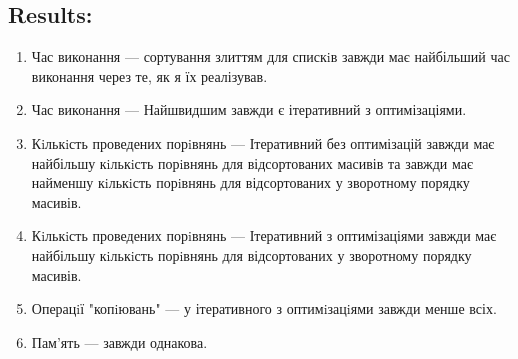 \documentclass{article}
\begin{document}
    \subsection{Results:}
    \begin{enumerate}
        \item Час виконання --- сортування злиттям для спискiв завжди має найбільший час виконання через те, як я їх реалізував.
        \item Час виконання --- Найшвидшим завжди є ітеративний з оптимізаціями.
        \item Кiлькiсть проведених порiвнянь --- Ітеративний без оптимізацій завжди має найбільшу кiлькiсть порiвнянь для відсортованих масивів та завжди має найменшу кiлькiсть порiвнянь для відсортованих у зворотному порядку масивів.
        \item Кiлькiсть проведених порiвнянь --- Ітеративний з оптимізаціями завжди має найбільшу кiлькiсть порiвнянь для відсортованих у зворотному порядку масивів.
        \item Операцiї "копiювань" --- у ітеративного з оптимiзацiями завжди менше всіх.
        \item Пам'ять ---  завжди однакова.
    \end{enumerate}
\end{document}
